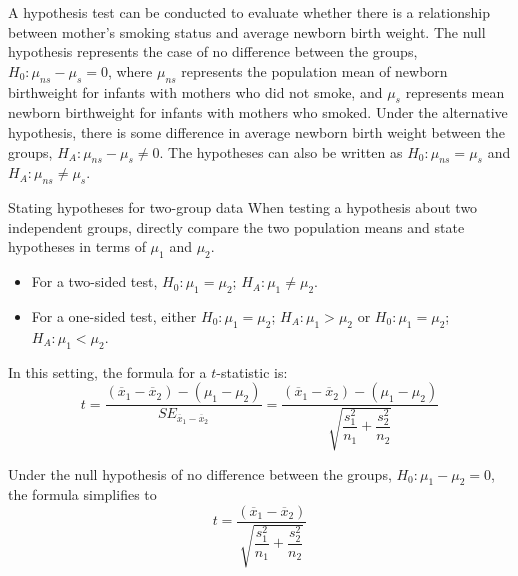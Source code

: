 A hypothesis test can be conducted to evaluate whether there is a relationship between mother's smoking status and average newborn birth weight. The null hypothesis represents the case of no difference between the groups, $H_0: \mu_{ns} - \mu_{s} = 0$, where $\mu_{ns}$ represents the population mean of newborn birthweight for infants with mothers who did not smoke, and $\mu_s$ represents mean newborn birthweight for infants with mothers who smoked. Under the alternative hypothesis, there is some difference in average newborn birth weight between the groups, $H_A: \mu_{ns} - \mu_{s} \neq 0$. The hypotheses can also be written as $H_0: \mu_{ns} = \mu_{s}$ and $H_A: \mu_{ns} \neq \mu_{s}$.

\begin{onebox}{Stating hypotheses for two-group data}
When testing a hypothesis about two independent groups, directly compare the two population means and state hypotheses in terms of $\mu_1$ and $\mu_2$.
\begin{itemize}
	\item For a two-sided test, $H_0: \mu_{1} = \mu_{2}$; $H_A: \mu_{1} \neq \mu_{2}$.
	\item For a one-sided test, either $H_0: \mu_{1} = \mu_{2}$; $H_A: \mu_{1} > \mu_{2}$ or  $H_0: \mu_{1} = \mu_{2}$; $H_A: \mu_{1} < \mu_{2}$.
\end{itemize}
\end{onebox}


\textD{\newpage}

In this setting, the formula for a $t$-statistic is:
\[t = \dfrac{(\overline{x}_1 - \overline{x}_2) - (\mu_1 - \mu_2)}{SE_{\overline{x}_{1} - \overline{x}_{2}}} = \dfrac{(\overline{x}_1 - \overline{x}_2) - (\mu_1 - \mu_2)}{\sqrt{\dfrac{s_{1}^{2}}{n_1} + \dfrac{s_{2}^{2}}{n_2}}} \]

Under the null hypothesis of no difference between the groups, $H_0: \mu_{1} - \mu_{2} = 0$, the formula simplifies to
\[t = \dfrac{(\overline{x}_1 - \overline{x}_2)}{\sqrt{\dfrac{s_{1}^{2}}{n_1} + \dfrac{s_{2}^{2}}{n_2}}}\]

